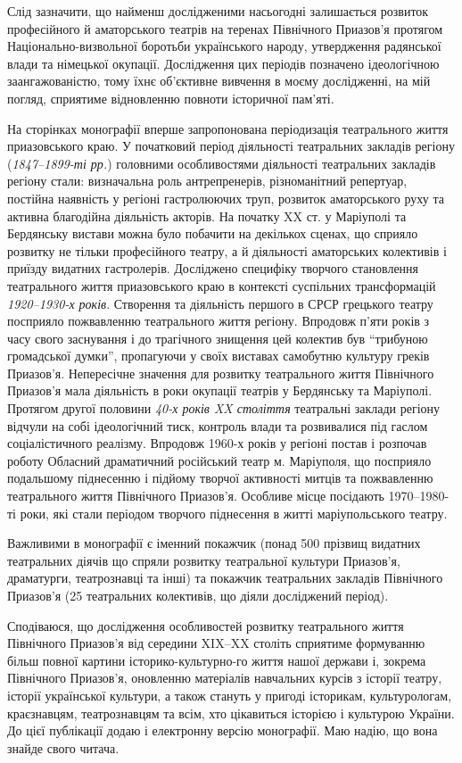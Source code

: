 Слід зазначити, що найменш дослідженими насьогодні залишається розвиток
професійного й аматорського театрів на теренах Північного Приазов'я протягом
Національно-визвольної боротьби українського народу, утвердження радянської
влади та німецької окупації. Дослідження цих періодів позначено ідеологічною
заангажованістю, тому їхнє об'єктивне вивчення в моєму дослідженні, на мій
погляд, сприятиме відновленню повноти історичної пам'яті.


На сторінках монографії вперше запропонована періодизація театрального життя
приазовського краю. У початковий період діяльності театральних закладів регіону
(\emph{1847–1899-ті рр.}) головними особливостями діяльності театральних закладів
регіону стали: визначальна роль антрепренерів, різноманітний репертуар,
постійна наявність у регіоні гастролюючих труп, розвиток аматорського руху та
активна благодійна діяльність акторів. На початку XX ст. у Маріуполі та
Бердянську вистави можна було побачити на декількох сценах, що сприяло розвитку
не тільки професійного театру, а й діяльності аматорських колективів і приїзду
видатних гастролерів. Досліджено специфіку творчого становлення театрального
життя приазовського краю в контексті суспільних трансформацій \emph{1920–1930-х
років}. Створення та діяльність першого в СРСР грецького театру посприяло
пожвавленню театрального життя регіону. Впродовж п'яти років з часу свого
заснування і до трагічного знищення цей колектив був \enquote{трибуною громадської
думки}, пропагуючи у своїх виставах самобутню культуру греків Приазов'я.
Непересічне значення для розвитку театрального життя Північного Приазов'я мала
діяльність в роки окупації театрів у Бердянську та Маріуполі. Протягом другої
половини \emph{40-х років XX століття} театральні заклади регіону відчули на собі
ідеологічний тиск, контроль влади та розвивалися під гаслом соціалістичного
реалізму. Впродовж 1960-х років у регіоні постав і розпочав роботу Обласний
драматичний російський театр м. Маріуполя, що посприяло подальшому піднесенню і
підйому творчої активності митців та пожвавленню театрального життя Північного
Приазов'я. Особливе місце посідають 1970–1980-ті роки, які стали періодом
творчого піднесення в житті маріупольського театру.

Важливими в монографії є іменний покажчик (понад 500 прізвищ видатних
театральних діячів що спряли розвитку театральної культури Приазов'я,
драматурги, театрознавці та інші) та покажчик театральних закладів Північного
Приазов'я (25 театральних колективів, що діяли  досліджений період).


Сподіваюся, що дослідження особливостей розвитку театрального життя Північного
Приазов'я від середини XIX–XX століть сприятиме формуванню більш повної картини
історико-культурно\hyp{}го життя нашої держави і, зокрема Північного Приазов'я,
оновленню матеріалів навчальних курсів з історії театру, історії української
культури, а також стануть у пригоді історикам, культурологам, краєзнавцям,
театрознавцям та всім, хто цікавиться історією і культурою України. До цієї
публікації додаю і електронну версію монографії. Маю надію, що вона знайде
свого читача.
